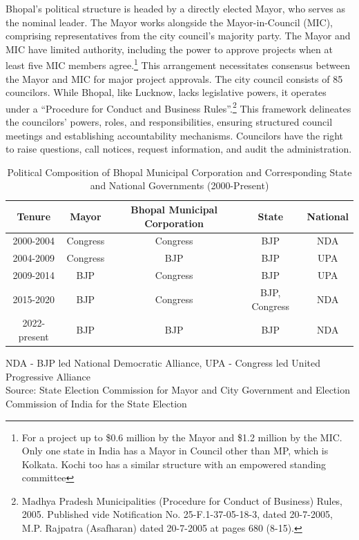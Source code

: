 Bhopal's political structure is headed by a directly elected Mayor, who serves as the nominal leader. The Mayor works alongside the Mayor-in-Council (MIC), comprising representatives from the city council's majority party. The Mayor and MIC have limited authority, including the power to approve projects when at least five MIC members agree.\footnote{For a project up to \$0.6 million by the Mayor and \$1.2 million by the MIC. Only one state in India has a Mayor in Council other than MP, which is Kolkata. Kochi too has a similar structure with an empowered standing committee} This arrangement necessitates consensus between the Mayor and MIC for major project approvals. The city council consists of 85 councilors. While Bhopal, like Lucknow, lacks legislative powers, it operates under a ``Procedure for Conduct and Business Rules''.\footnote{Madhya Pradesh Municipalities (Procedure for Conduct of Business) Rules, 2005. Published vide Notification No. 25-F.1-37-05-18-3, dated 20-7-2005, M.P. Rajpatra (Asafharan) dated 20-7-2005 at pages 680 (8-15).} This framework delineates the councilors' powers, roles, and responsibilities, ensuring structured council meetings and establishing accountability mechanisms. Councilors have the right to raise questions, call notices, request information, and audit the administration.

\begin{table}[ht]
\centering
\caption{Political Composition of Bhopal Municipal Corporation and Corresponding State and National Governments (2000-Present)}
\label{tab:bhopal_political}
\begin{tabular}{|c|c|c|c|c|}
\hline
\textbf{Tenure} & \textbf{Mayor} & \textbf{Bhopal Municipal Corporation} & \textbf{State} & \textbf{National} \\
\hline
2000-2004 & Congress & Congress & BJP & NDA \\
\hline
2004-2009 & Congress & BJP & BJP & UPA \\
\hline
2009-2014 & BJP & Congress & BJP & UPA \\
\hline
2015-2020 & BJP & Congress & BJP, Congress & NDA \\
\hline
2022-present & BJP & BJP & BJP & NDA \\
\hline
\end{tabular}
\raggedright
\small NDA - BJP led National Democratic Alliance, UPA - Congress led United Progressive Alliance\\
\small Source: State Election Commission for Mayor and City Government and Election Commission of India for the State Election
\end{table}

